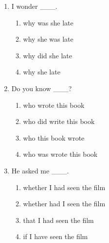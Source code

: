 \documentclass[11pt,a4paper]{ctexart}
\begin{document}
\begin{enumerate}[leftmargin=*,itemsep=4pt]
\begin{enumerate}[label=\Alph*.,leftmargin=2em,itemsep=1pt,topsep=2pt]
\item how I can get there
\item how could I get there
\item how I could get there
\end{enumerate}
\item I wonder \_\_\_.
\begin{enumerate}[label=\Alph*.,leftmargin=2em,itemsep=1pt,topsep=2pt]
\item why was she late
\item why she was late
\item why did she late
\item why she late
\end{enumerate}
\item Do you know \_\_\_?
\begin{enumerate}[label=\Alph*.,leftmargin=2em,itemsep=1pt,topsep=2pt]
\item who wrote this book
\item who did write this book
\item who this book wrote
\item who was wrote this book
\end{enumerate}
\item He asked me \_\_\_.
\begin{enumerate}[label=\Alph*.,leftmargin=2em,itemsep=1pt,topsep=2pt]
\item whether I had seen the film
\item whether had I seen the film
\item that I had seen the film
\item if I have seen the film
\end{enumerate}
\end{enumerate}
\end{document}
